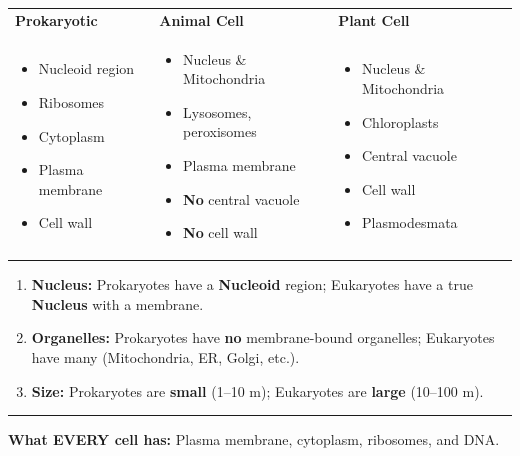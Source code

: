 \documentclass[11pt, letterpaper]{article}
\newcommand{\divider}{\par\noindent\rule{\textwidth}{0.4pt}\par\vspace{2pt}}
\begin{document}
\noindent
\begin{tabular}{@{} p{} p{} p{} @{}}
\textbf{Prokaryotic} & \textbf{Animal Cell} & \textbf{Plant Cell} \\ \addlinespace[0.5pt]
\vspace{-0.7em}
\begin{itemize}[noitemsep, topsep=0pt, leftmargin=*]
  \item Nucleoid region
  \item Ribosomes
  \item Cytoplasm
  \item Plasma membrane
  \item Cell wall
\end{itemize} &
\vspace{-0.7em}
\begin{itemize}[noitemsep, topsep=0pt, leftmargin=*]
  \item Nucleus \& Mitochondria
  \item Lysosomes, peroxisomes
  \item Plasma membrane
  \item \textbf{No} central vacuole
  \item \textbf{No} cell wall
\end{itemize} &
\vspace{-0.7em}
\begin{itemize}[noitemsep, topsep=0pt, leftmargin=*]
  \item Nucleus \& Mitochondria
  \item Chloroplasts
  \item Central vacuole
  \item Cell wall
  \item Plasmodesmata
\end{itemize} \\
\end{tabular}

\vspace{6pt}

\begin{tcolorbox}[colback=rowB, colframe=sectionblue, title={\bfseries The ``Big Three'' Differentiators}, arc=3pt, boxrule=1pt]
\begin{enumerate}[noitemsep]
  \item \textbf{Nucleus:} Prokaryotes have a \textbf{Nucleoid} region; Eukaryotes have a true \textbf{Nucleus} with a membrane.
  \item \textbf{Organelles:} Prokaryotes have \textbf{no} membrane-bound organelles; Eukaryotes have many (Mitochondria, ER, Golgi, etc.).
  \item \textbf{Size:} Prokaryotes are \textbf{small} (1--10 \textmu m); Eukaryotes are \textbf{large} (10--100 \textmu m).
\end{enumerate}
\divider
\textbf{What EVERY cell has:} Plasma membrane, cytoplasm, ribosomes, and DNA.
\end{tcolorbox}
\end{document}

